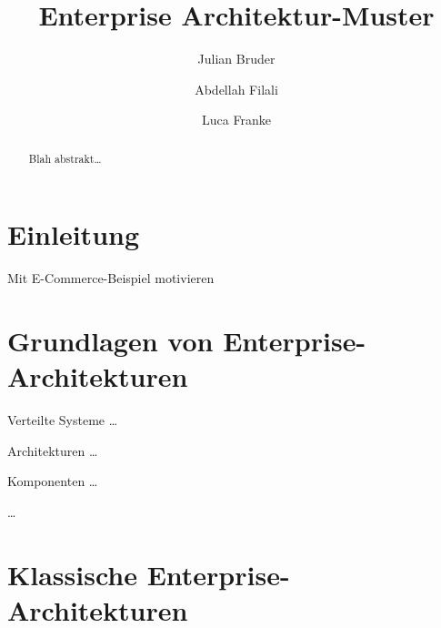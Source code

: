 \documentclass[acmtog]{acmart}
\begin{document}
\title{Enterprise Architektur-Muster}

\author{Julian Bruder}
\author{Abdellah Filali}
\authornotemark[1]
\author{Luca Franke}
\authornotemark[1]
\renewcommand{\shortauthors}{Bruder, Filali, Franke}

\begin{abstract}
Blah abstrakt\ldots
\end{abstract}

\maketitle

\section{Einleitung}
Mit E-Commerce-Beispiel motivieren

\section{Grundlagen von Enterprise-Architekturen}
Verteilte Systeme \ldots

Architekturen \ldots

Komponenten \ldots

\ldots


\section{Klassische Enterprise-Architekturen}
\end{document}
